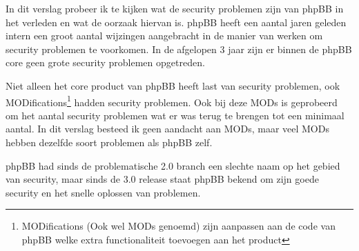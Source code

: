 In dit verslag probeer ik te kijken wat de security problemen zijn van phpBB in het verleden en wat de oorzaak hiervan is. phpBB heeft een aantal jaren geleden intern een groot aantal wijzingen aangebracht in de manier van werken om security problemen te voorkomen. In de afgelopen 3 jaar zijn er binnen de phpBB core geen grote security problemen opgetreden\cite{bib.phpbb.secunia}.

Niet alleen het core product van phpBB heeft last van security problemen, ook MODifications\footnote{MODifications (Ook wel MODs genoemd) zijn aanpassen aan de code van phpBB welke extra functionaliteit toevoegen aan het product} hadden security problemen. Ook bij deze MODs is geprobeerd om het aantal security problemen wat er was terug te brengen tot een minimaal aantal. In dit verslag besteed ik geen aandacht aan MODs, maar veel MODs hebben dezelfde soort problemen als phpBB zelf.

phpBB had sinds de problematische 2.0 branch een slechte naam op het gebied van security, maar sinds de 3.0 release staat phpBB bekend om zijn goede security en het snelle oplossen van problemen.
